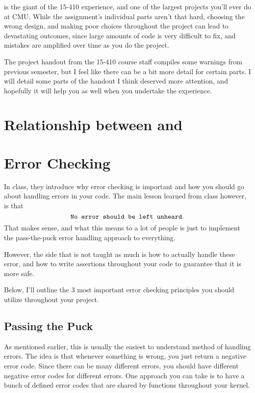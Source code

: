 \documentclass{article}
\begin{document}
\thispagestyle{empty} %
\maketitle
{} is the giant of the 15-410 experience, and one of the largest projects you'll ever do at CMU.
While the assignment's individual parts aren't that hard, choosing the wrong design, and making
poor choices throughout the project can lead to devastating outcomes, since large amounts of code
is very difficult to fix, and mistakes are amplified over time as you do the project.

The project handout from the 15-410 course staff compiles some warnings from previous
semester, but I feel like there can be a bit more detail for certain parts. I will 
detail some parts of the handout I think deserved more attention, and hopefully it will
help you as well when you undertake the  experience.

\section{Relationship between  and }


\section{Error Checking}
\label{sec:error}
In class, they introduce why error checking is important and how you should
go about handling errors in your code. The main lesson learned from class however,
is that 
\begin{equation}
  \texttt{No error should be left unheard}.
\end{equation}
That makes sense, and what this means to a lot of people is just to implement
the pass-the-puck error handling approach to everything.

However, the side that is not taught as much is how to actually handle these
error, and how to write assertions throughout your code to guarantee 
that it is more safe. 

Below, I'll outline the 3 most important error checking principles you should
utilize throughout your project.

\subsection{Passing the Puck}
As mentioned earlier, this is usually the easiest to understand method of handling
errors. The idea is that whenever something is wrong, you just return a negative error code.
Since there can be many different errors, you should have different negative error codes
for different errors. One approach you can take is to have a bunch of defined
error codes that are shared by functions throughout your kernel.
\end{document}
